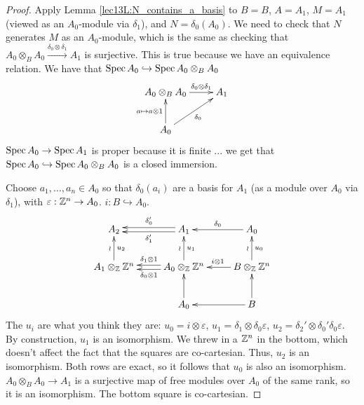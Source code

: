  \begin{proof} 
   Apply Lemma \ref{lec13L:N_contains_a_basis} to $B=B$, $A=A_1$, $M=A_1$ (viewed as an
   $A_0$-module via $\delta_1$), and $N=\delta_0(A_0)$. We need to check that $N$
   generates $M$ as an $A_0$-module, which is the same as checking that $A_0\otimes_B
   A_0\xrightarrow{\delta_0\otimes \delta_1} A_1$ is surjective. This is true because we
   have an equivalence relation. We have that $\operatorname{Spec} A_0\hookrightarrow \operatorname{Spec}
   A_0\otimes_B A_0$
   \[\xymatrix{
    A_0\otimes_B A_0\ar[r]^<>(.5){\delta_0\otimes \delta_1} & A_1\\
    A_0\ar[u]^{a\mapsto a\otimes 1} \ar[ur]_{\delta_0}
   }\]
    $\operatorname{Spec} A_0\to \operatorname{Spec} A_1$ is proper because it is finite ... we get that $\operatorname{Spec}
   A_0\hookrightarrow \operatorname{Spec} A_0\otimes_B A_0$ is a closed immersion.

   Choose $a_1,\dots, a_n\in A_0$ so that $\delta_0(a_i)$ are a basis for $A_1$ (as a
   module over $A_0$ via $\delta_1$), with $\varepsilon:\mathbb{Z}^n\to A_0$.
   $i:B\hookrightarrow A_0$.
   \[\xymatrix{
    A_2 & A_1 \ar@<.5ex>[l]^{\delta_1'} \ar@<-.5ex>[l]_{\delta_0'} & A_0 \ar[l]_{\delta_0}\\
    A_1\otimes_\ZZ \ZZ^n \ar[u]^\wr_{u_2}& A_0\otimes_\ZZ \ZZ^n \ar[u]_{u_1}^\wr
    \ar@<.5ex>[l]^{\delta_0\otimes 1} \ar@<-.5ex>[l]_{\delta_1\otimes 1} & B\otimes_\ZZ \ZZ^n
    \ar[u]_{u_0}^\wr  \ar[l]_{i\otimes 1}\\
    & A_0 \ar[u] & B\ar[u] \ar[l]
   }\]
    The $u_i$ are what you think they are: $u_0=i\otimes \varepsilon$,
   $u_1=\delta_1\otimes \delta_0\varepsilon$, $u_2=\delta_2'\otimes
   \delta_0'\delta_0\varepsilon$. By construction, $u_1$ is an isomorphism. We threw in a
   $\mathbb{Z}^n$ in the bottom, which doesn't affect the fact that the squares are
   co-cartesian. Thus, $u_2$ is an isomorphism. Both rows are exact, so it follows that
   $u_0$ is also an isomorphism.  $A_0\otimes_B A_0 \to A_1$ is a surjective
   map of free modules over $A_0$ of the same rank, so it is an isomorphism. The bottom
   square is co-cartesian.
 \end{proof}

